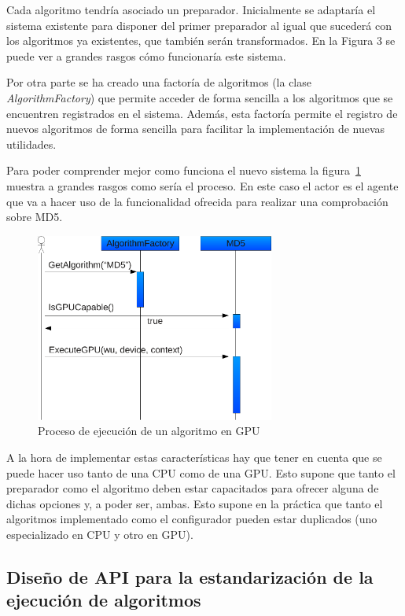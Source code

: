 Cada algoritmo tendría asociado un preparador. Inicialmente se adaptaría el sistema existente para disponer del primer preparador al igual que sucederá con los algoritmos ya existentes, que también serán transformados. En la Figura 3 se puede ver a grandes rasgos cómo funcionaría este sistema.

Por otra parte se ha creado una factoría de algoritmos (la clase \emph{AlgorithmFactory}) que permite acceder de forma sencilla a los algoritmos que se encuentren registrados en el sistema. Además, esta factoría permite el registro de nuevos algoritmos de forma sencilla para facilitar la implementación de nuevas utilidades.

Para poder comprender mejor como funciona el nuevo sistema la figura~\ref{fig:algotirmo_gpu} muestra a grandes rasgos como sería el proceso. En este caso el actor es el agente que va a hacer uso de la funcionalidad ofrecida para realizar una comprobación sobre MD5.

\begin{figure}
	\centering
	\includegraphics[width=0.7\textwidth]{images/algoritmo_gpu.pdf}
	\caption{Proceso de ejecución de un algoritmo en GPU}\label{fig:algotirmo_gpu}
\end{figure}

A la hora de implementar estas características hay que tener en cuenta que se puede hacer uso tanto de una CPU como de una GPU. Esto supone que tanto el preparador como el algoritmo deben estar capacitados para ofrecer alguna de dichas opciones y, a poder ser, ambas. Esto supone en la práctica que tanto el algoritmos implementado como el configurador pueden estar duplicados (uno especializado en CPU y otro en GPU).



\subsection{Diseño de API para la estandarización de la ejecución de algoritmos}


